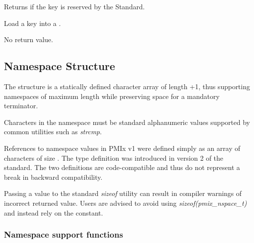 Returns  if the key is reserved by the Standard.


Load a key into a .


\begin{arglist}
\end{arglist}

No return value.

\subsection{Namespace Structure}

The  structure is a statically defined character array of length +1, thus supporting namespaces of maximum length  while preserving space for a mandatory  terminator.


Characters in the namespace must be standard alphanumeric values supported by common utilities such as \textit{strcmp}.

\adviceuserstart
References to namespace values in \ac{PMIx} v1 were defined simply as an array of characters of size . The  type definition was introduced in version 2 of the standard. The two definitions are code-compatible and thus do not represent a break in backward compatibility.

Passing a  value to the standard \textit{sizeof} utility can result in compiler warnings of incorrect returned value. Users are advised to avoid using \textit{sizeof(pmix_nspace_t)} and instead rely on the  constant.
\adviceuserend

\subsubsection{Namespace support functions}

